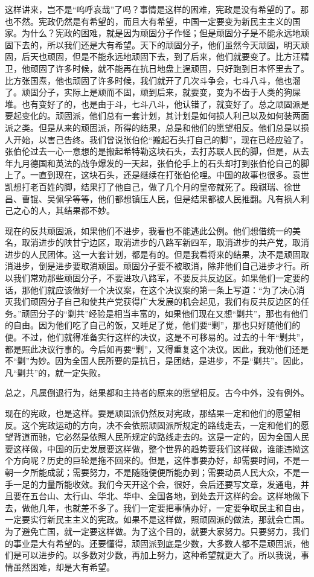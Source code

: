 这样讲来，岂不是“呜呼哀哉”了吗？事情是这样的困难，宪政是没有希望的了。那也不然。宪政仍然是有希望的，而且大有希望，中国一定要变为新民主主义的国家。为什么？宪政的困难，就是因为顽固分子作怪；但是顽固分子是不能永远地顽固下去的，所以我们还是大有希望。天下的顽固分子，他们虽然今天顽固，明天顽固，后天也顽固，但是不能永远地顽固下去，到了后来，他们就要变了。比方汪精卫，他顽固了许多时候，就不能再在抗日地盘上逞顽固，只好跑到日本怀里去了。比方张国焘，他也顽固了许多时候，我们就开了几次斗争会，七斗八斗，他也溜了。顽固分子，实际上是顽而不固，顽到后来，就要变，变为不齿于人类的狗屎堆。也有变好了的，也是由于斗，七斗八斗，他认错了，就变好了。总之顽固派是要起变化的。顽固派，他们总有一套计划，其计划是如何损人利己以及如何装两面派之类。但是从来的顽固派，所得的结果，总是和他们的愿望相反。他们总是以损人开始，以害己告终。我们曾说张伯伦“搬起石头打自己的脚”，现在已经应验了。张伯伦过去一心一意想的是搬起希特勒这块石头，去打苏联人民的脚，但是，从去年九月德国和英法的战争爆发的一天起，张伯伦手上的石头却打到张伯伦自己的脚上了。一直到现在，这块石头，还是继续在打张伯伦哩。中国的故事也很多。袁世凯想打老百姓的脚，结果打了他自己，做了几个月的皇帝就死了。段祺瑞、徐世昌、曹锟、吴佩孚等等，他们都想镇压人民，但是结果都被人民推翻。凡有损人利己之心的人，其结果都不妙。

现在的反共顽固派，如果他们不进步，我看也不能逃此公例。他们想借统一的美名，取消进步的陕甘宁边区，取消进步的八路军新四军，取消进步的共产党，取消进步的人民团体。这一大套计划，都是有的。但是我看将来的结果，决不是顽固取消进步，倒是进步要取消顽固。顽固分子要不被取消，除非他们自己进步才行。所以我们常劝那些顽固分子，不要进攻八路军，不要反共反边区。如果他们一定要的话，那他们就应该做好一个决议案，在这个决议案的第一条上写道：“为了决心消灭我们顽固分子自己和使共产党获得广大发展的机会起见，我们有反共反边区的任务。”顽固分子的“剿共”经验是相当丰富的，如果他们现在又想“剿共”，那也有他们的自由。因为他们吃了自己的饭，又睡足了觉，他们要“剿”，那也只好随他们的便。不过，他们就得准备实行这样的决议，这是不可移易的。过去的十年“剿共”，都是照此决议行事的。今后如再要“剿”，又得重复这个决议。因此，我劝他们还是不“剿”为妙。因为全国人民所要的是抗日，是团结，是进步，不是“剿共”。因此，凡“剿共”的，就一定失败。

总之，凡属倒退行为，结果都和主持者的原来的愿望相反。古今中外，没有例外。

现在的宪政，也是这样。要是顽固派仍然反对宪政，那结果一定和他们的愿望相反。这个宪政运动的方向，决不会依照顽固派所规定的路线走去，一定和他们的愿望背道而驰，它必然是依照人民所规定的路线走去的。这是一定的，因为全国人民要这样做，中国的历史发展要这样做，整个世界的趋势要我们这样做，谁能违拗这个方向呢？历史的巨轮是拖不回来的。但是，这件事要办好，却需要时间，不是一朝一夕所能成就；需要努力，不是随随便便所能办到；需要动员人民大众，不是一手一足的力量所能收效。我们今天开这个会，很好，会后还要写文章，发通电，并且要在五台山、太行山、华北、华中、全国各地，到处去开这样的会。这样地做下去，做他几年，也就差不多了。我们一定要把事情办好，一定要争取民主和自由，一定要实行新民主主义的宪政。如果不是这样做，照顽固派的做法，那就会亡国。为了避免亡国，就一定要这样做。为了这个目的，就要大家努力。只要努力，我们的事业是大有希望的。还要懂得，顽固派到底是少数，大多数人都不是顽固派，他们是可以进步的。以多数对少数，再加上努力，这种希望就更大了。所以我说，事情虽然困难，却是大有希望。


